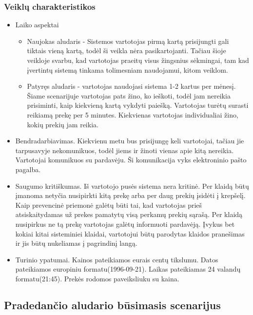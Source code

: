 \documentclass[oneside]{VUMIFPSkursinis}
\begin{document}
		\subsubsection{Veiklų charakteristikos}
			\begin{itemize}
				\item{Laiko aspektai}
					\begin{itemize}
						\item{
							Naujokas aludaris - Sistemos vartotojas pirmą kartą prisijungti gali tiktais vieną kartą, todėl ši veikla nėra pasikartojanti.
							Tačiau šioje veikloje svarbu, kad vartotojas praeitų visus žingsnius sėkmingai, tam kad įvertintų sistemą tinkama tolimesniam naudojamui, kitom veiklom.
						}
						\item{
							Patyręs aludaris - vartotojas naudojasi sistema 1-2 kartus per mėnesį.
							Šiame scenarijuje vartotojas pats žino, ko ieškoti, todėl jam nereikia prisiminti, kaip kiekvieną kartą vykdyti paiešką.
							Vartotojas turėtų surasti reikiamą prekę per 5 minutes.
							Kiekvienas vartotojas individualiai žino, kokių prekių jam reikia.
						}
					\end{itemize}
				\item{Bendradarbiavimas.}
					Kiekvienu metu bus prisijungę keli vartotojai, tačiau jie tarpusavyje nekomunikuos, todėl jiems ir žinoti vienas apie kitą nereikia.
					Vartotojai komunikuos su pardavėju.
					Ši komunikacija vyks elektroninio pašto pagalba.
				\item{Saugumo kritiškumas.}
					Iš vartotojo pusės sistema nera kritinė.
					Per klaidą būtų įmanoma netyčia nusipirkti kitą prekę arba per daug prekių įsidėti į krepšelį.
					Kaip prevencinė priemonė galėtų būti tai, kad vartotojas prieš atsiskaitydamas už prekes pamatytų visą perkamų prekių sąrašą.
					Per klaidą nusipirkus ne tą prekę vartotojas galėtų informuoti pardavėją.
					Įvykus bet kokiai kitai sisteminiei klaidai, vartotojui būtų parodytas klaidos pranešimas ir jis būtų nukeliamas į pagrindinį langą.
				\item{Turinio ypatumai.}
					Kainos pateikiamos eurais centų tikslumu.
					Datos pateikiamos europiniu formatu(1996-09-21).
					Laikas pateikiamas 24 valandų formatu(21:45).
					Prekės rodomos paveiksliuku su kaina.
			\end{itemize}
	\subsection{Pradedančio aludario būsimasis scenarijus}
\end{document}
